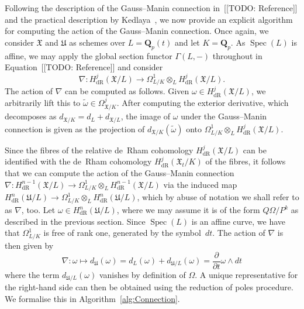 \documentclass[a4paper,11pt]{article}
\numberwithin{equation}{section}
\renewcommand{\to}{\rightarrow}        %
\DeclareMathOperator{\Spec}{Spec}        %
\providecommand{\HdR}{H_{\text{dR}}}    %
\theoremstyle{definition}
\begin{document}
Following the description of the Gauss--Manin connection 
in~[[TODO:  Reference]]
and the practical description by Kedlaya~\citep[\S 3.2]{Kedlaya2008a}, 
we now provide an explicit algorithm for computing the action of the 
Gauss--Manin connection.  Once again, we consider $\mathfrak{X}$ and 
$\mathfrak{U}$ as schemes over $L = \mathbf{Q}_p(t)$ and let $K = \mathbf{Q}_p$.
As $\Spec(L)$ is affine, we may apply the global section functor $\Gamma(L, -)$ 
throughout in Equation~[[TODO: Reference]] and consider
\begin{equation}
\nabla \colon \HdR^j(\mathfrak{X}/L) \to 
    \Omega_{L/K}^1 \otimes_{L} \HdR^j(\mathfrak{X}/L).
\end{equation}
The action of $\nabla$ can be computed as follows.  Given 
$\omega \in \HdR^j(\mathfrak{X}/L)$, we arbitrarily lift this to 
$\tilde{\omega} \in \Omega_{\mathfrak{X}/K}^j$.  After computing the 
exterior derivative, which decomposes as 
\mbox{$d_{\mathfrak{X}/K} = d_{L} + d_{\mathfrak{X}/L}$}, 
the image of $\omega$ under the Gauss--Manin connection is given as 
the projection of $d_{\mathfrak{X}/K}(\tilde{\omega})$ onto 
$\Omega_{L/K}^1 \otimes_{L} \HdR^j(\mathfrak{X}/L)$.

Since the fibres of the relative de~Rham cohomology 
$\HdR^j(\mathfrak{X}/L)$ can be identified with the de~Rham 
cohomology $\HdR^j(\mathfrak{X}_t/K)$ of the fibres, it 
follows that we can compute the action of the Gauss--Manin connection 
$\nabla \colon \HdR^{n-1}(\mathfrak{X}/L) \to 
\Omega_{L/K}^1 \otimes_{L} \HdR^{n-1}(\mathfrak{X}/L)$
via the induced map 
$\HdR^n(\mathfrak{U}/L) \to 
\Omega_{L/K}^1 \otimes_{L} \HdR^n(\mathfrak{U}/L)$, 
which by abuse of notation we shall refer to as $\nabla$, too.  
Let $\omega \in \HdR^{n}(\mathfrak{U}/L)$, where we may 
assume it is of the form $Q \Omega / P^k$ as described in the 
previous section.  Since $\Spec(L)$ is an affine curve, we have 
that $\Omega_{L/K}^1$ is free of rank one, generated by the symbol~$dt$. 
The action of $\nabla$ is then given by 
\begin{equation}
\nabla \colon \omega \mapsto d_{\mathfrak{U}}(\omega) = 
    d_{L}(\omega) + d_{\mathfrak{U}/L}(\omega) = 
    \frac{\partial}{\partial t} \omega \wedge dt
\end{equation}
where the term $d_{\mathfrak{U}/L}(\omega)$ vanishes by 
definition of $\Omega$.  A unique representative for the 
right-hand side can then be obtained using the reduction 
of poles procedure.  We formalise this in Algorithm~\ref{alg:Connection}.
\end{document}
